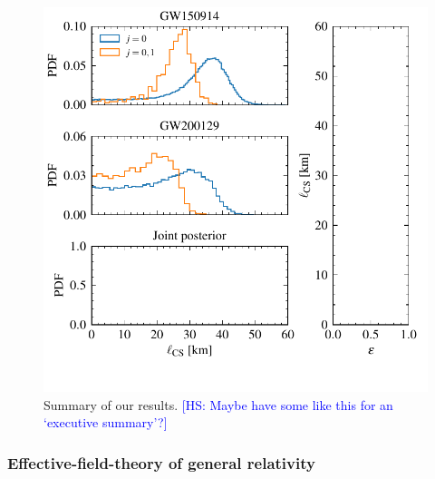 \documentclass[twocolumn,prd,aps,superscriptaddress,preprintnumbers,tightenlines,showpacs,nofootinbib,eqsecnum,amsfonts,amsmath,longbibliography]{revtex4-1}
\newcommand{\hs}[1]{{\textcolor{blue}{{[HS: #1]}} }}
\begin{document}
\begin{figure}[t]
\includegraphics[width=\columnwidth]{figs/posteriors_for_exs.pdf}
\caption{Summary of our results.
\hs{Maybe have some like this for an `executive summary'?}
}
\label{fig:dCS_exec_sum}
\end{figure}



\subsubsection{Effective-field-theory of general relativity}
\label{sec:results_efts}
\end{document}
